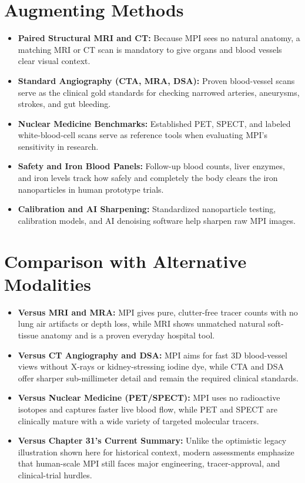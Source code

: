 \section{Augmenting Methods}
\begin{itemize}
  \item \textbf{Paired Structural MRI and CT:} Because MPI sees no natural anatomy, a matching MRI or CT scan is mandatory to give organs and blood vessels clear visual context.
  \item \textbf{Standard Angiography (CTA, MRA, DSA):} Proven blood-vessel scans serve as the clinical gold standards for checking narrowed arteries, aneurysms, strokes, and gut bleeding.
  \item \textbf{Nuclear Medicine Benchmarks:} Established PET, SPECT, and labeled white-blood-cell scans serve as reference tools when evaluating MPI's sensitivity in research.
  \item \textbf{Safety and Iron Blood Panels:} Follow-up blood counts, liver enzymes, and iron levels track how safely and completely the body clears the iron nanoparticles in human prototype trials.
  \item \textbf{Calibration and AI Sharpening:} Standardized nanoparticle testing, calibration models, and AI denoising software help sharpen raw MPI images.
\end{itemize}

\section{Comparison with Alternative Modalities}
\begin{itemize}
  \item \textbf{Versus MRI and MRA:} MPI gives pure, clutter-free tracer counts with no lung air artifacts or depth loss, while MRI shows unmatched natural soft-tissue anatomy and is a proven everyday hospital tool.
  \item \textbf{Versus CT Angiography and DSA:} MPI aims for fast 3D blood-vessel views without X-rays or kidney-stressing iodine dye, while CTA and DSA offer sharper sub-millimeter detail and remain the required clinical standards.
  \item \textbf{Versus Nuclear Medicine (PET/SPECT):} MPI uses no radioactive isotopes and captures faster live blood flow, while PET and SPECT are clinically mature with a wide variety of targeted molecular tracers.
  \item \textbf{Versus Chapter 31's Current Summary:} Unlike the optimistic legacy illustration shown here for historical context, modern assessments emphasize that human-scale MPI still faces major engineering, tracer-approval, and clinical-trial hurdles.
\end{itemize}

